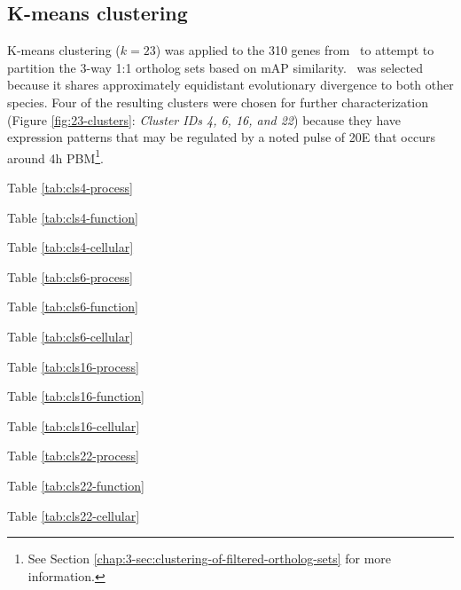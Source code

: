 \subsection{K-means clustering}

K-means clustering ($k=23$) was applied to the 310 genes from \Ag\ to attempt to partition the 3-way 1:1 ortholog sets based on \gls{mAP} similarity.
%
\Ag\ was selected because it shares approximately equidistant evolutionary divergence to both other species.
%
Four of the resulting clusters were chosen for further characterization (Figure \ref{fig:23-clusters}: \textit{Cluster IDs 4, 6, 16, and 22}) because they have expression patterns that may be regulated by a noted pulse of \gls{20E} that occurs around 4h \gls{PBM}\footnote{See Section \ref{chap:3-sec:clustering-of-filtered-ortholog-sets} for more information.}.
%





Table \ref{tab:cls4-process}

Table \ref{tab:cls4-function}

Table \ref{tab:cls4-cellular}


Table \ref{tab:cls6-process}

Table \ref{tab:cls6-function}

Table \ref{tab:cls6-cellular}


Table \ref{tab:cls16-process}

Table \ref{tab:cls16-function}

Table \ref{tab:cls16-cellular}


Table \ref{tab:cls22-process}

Table \ref{tab:cls22-function}

Table \ref{tab:cls22-cellular}

% 
% 
% 
% 




